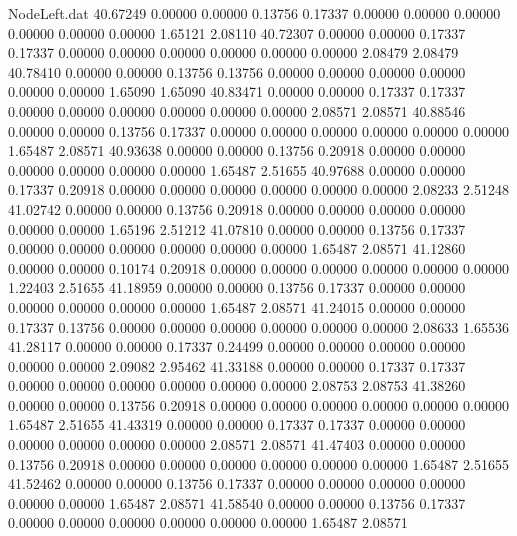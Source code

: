 \begin{filecontents}{NodeLeft.dat}
  40.67249    0.00000    0.00000     0.13756    0.17337    0.00000    0.00000    0.00000    0.00000    0.00000    0.00000    1.65121    2.08110
  40.72307    0.00000    0.00000     0.17337    0.17337    0.00000    0.00000    0.00000    0.00000    0.00000    0.00000    2.08479    2.08479
  40.78410    0.00000    0.00000     0.13756    0.13756    0.00000    0.00000    0.00000    0.00000    0.00000    0.00000    1.65090    1.65090
  40.83471    0.00000    0.00000     0.17337    0.17337    0.00000    0.00000    0.00000    0.00000    0.00000    0.00000    2.08571    2.08571
  40.88546    0.00000    0.00000     0.13756    0.17337    0.00000    0.00000    0.00000    0.00000    0.00000    0.00000    1.65487    2.08571
  40.93638    0.00000    0.00000     0.13756    0.20918    0.00000    0.00000    0.00000    0.00000    0.00000    0.00000    1.65487    2.51655
  40.97688    0.00000    0.00000     0.17337    0.20918    0.00000    0.00000    0.00000    0.00000    0.00000    0.00000    2.08233    2.51248
  41.02742    0.00000    0.00000     0.13756    0.20918    0.00000    0.00000    0.00000    0.00000    0.00000    0.00000    1.65196    2.51212
  41.07810    0.00000    0.00000     0.13756    0.17337    0.00000    0.00000    0.00000    0.00000    0.00000    0.00000    1.65487    2.08571
  41.12860    0.00000    0.00000     0.10174    0.20918    0.00000    0.00000    0.00000    0.00000    0.00000    0.00000    1.22403    2.51655
  41.18959    0.00000    0.00000     0.13756    0.17337    0.00000    0.00000    0.00000    0.00000    0.00000    0.00000    1.65487    2.08571
  41.24015    0.00000    0.00000     0.17337    0.13756    0.00000    0.00000    0.00000    0.00000    0.00000    0.00000    2.08633    1.65536
  41.28117    0.00000    0.00000     0.17337    0.24499    0.00000    0.00000    0.00000    0.00000    0.00000    0.00000    2.09082    2.95462
  41.33188    0.00000    0.00000     0.17337    0.17337    0.00000    0.00000    0.00000    0.00000    0.00000    0.00000    2.08753    2.08753
  41.38260    0.00000    0.00000     0.13756    0.20918    0.00000    0.00000    0.00000    0.00000    0.00000    0.00000    1.65487    2.51655
  41.43319    0.00000    0.00000     0.17337    0.17337    0.00000    0.00000    0.00000    0.00000    0.00000    0.00000    2.08571    2.08571
  41.47403    0.00000    0.00000     0.13756    0.20918    0.00000    0.00000    0.00000    0.00000    0.00000    0.00000    1.65487    2.51655
  41.52462    0.00000    0.00000     0.13756    0.17337    0.00000    0.00000    0.00000    0.00000    0.00000    0.00000    1.65487    2.08571
  41.58540    0.00000    0.00000     0.13756    0.17337    0.00000    0.00000    0.00000    0.00000    0.00000    0.00000    1.65487    2.08571

\end{filecontents}
